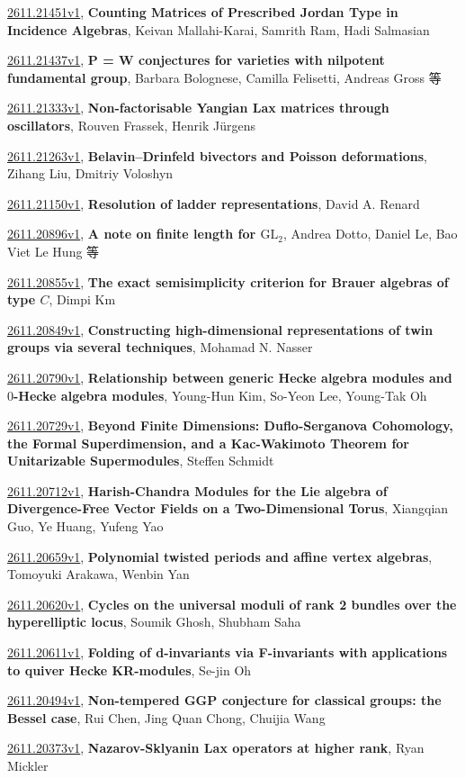 \documentclass[9pt, a4paper]{article}
\theoremstyle{plain}
\theoremstyle{definition}
\theoremstyle{remark}
\newcommand{\arxiv}[3]{\href{https://arxiv.org/abs/#1}{#1}, \textbf{\textcolor{arxivblue}{#2}}, #3}
\begin{document}
\arxiv{2611.21451v1}{Counting Matrices of Prescribed Jordan Type in Incidence Algebras}{Keivan Mallahi-Karai, Samrith Ram, Hadi Salmasian}

\arxiv{2611.21437v1}{P = W conjectures for varieties with nilpotent fundamental group}{Barbara Bolognese, Camilla Felisetti, Andreas Gross 等}

\arxiv{2611.21333v1}{Non-factorisable Yangian Lax matrices through oscillators}{Rouven Frassek, Henrik Jürgens}

\arxiv{2611.21263v1}{Belavin--Drinfeld bivectors and Poisson deformations}{Zihang Liu, Dmitriy Voloshyn}

\arxiv{2611.21150v1}{Resolution of ladder representations}{David A. Renard}

\arxiv{2611.20896v1}{A note on finite length for $\mathrm{GL}_2$}{Andrea Dotto, Daniel Le, Bao Viet Le Hung 等}

\arxiv{2611.20855v1}{The exact semisimplicity criterion for Brauer algebras of type $C$}{Dimpi Km}

\arxiv{2611.20849v1}{Constructing high-dimensional representations of twin groups via several techniques}{Mohamad N. Nasser}

\arxiv{2611.20790v1}{Relationship between generic Hecke algebra modules and $0$-Hecke algebra modules}{Young-Hun Kim, So-Yeon Lee, Young-Tak Oh}

\arxiv{2611.20729v1}{Beyond Finite Dimensions: Duflo-Serganova Cohomology, the Formal Superdimension, and a Kac-Wakimoto Theorem for Unitarizable Supermodules}{Steffen Schmidt}

\arxiv{2611.20712v1}{Harish-Chandra Modules for the Lie algebra of Divergence-Free Vector Fields on a Two-Dimensional Torus}{Xiangqian Guo, Ye Huang, Yufeng Yao}

\arxiv{2611.20659v1}{Polynomial twisted periods and affine vertex algebras}{Tomoyuki Arakawa, Wenbin Yan}

\arxiv{2611.20620v1}{Cycles on the universal moduli of rank 2 bundles over the hyperelliptic locus}{Soumik Ghosh, Shubham Saha}

\arxiv{2611.20611v1}{Folding of d-invariants via F-invariants with applications to quiver Hecke KR-modules}{Se-jin Oh}

\arxiv{2611.20494v1}{Non-tempered GGP conjecture for classical groups: the Bessel case}{Rui Chen, Jing Quan Chong, Chuijia Wang}

\arxiv{2611.20373v1}{Nazarov-Sklyanin Lax operators at higher rank}{Ryan Mickler}
\end{document}
